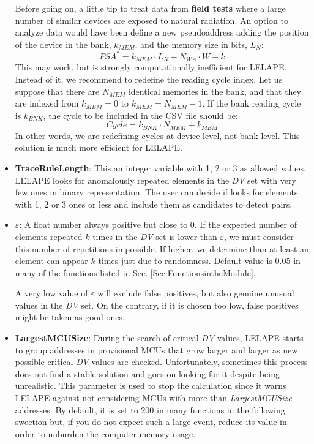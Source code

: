 \begin{itemize}
	Before going on, a little tip to treat data from\textbf{ field tests} where a large number of similar devices are exposed to natural radiation. An option to analyze data would have been define a new pseudoaddress adding the position of the device in the bank, \(k_{MEM}\), and the memory size in bits, \(L_N\):
	\[
		PSA^* = k_{MEM}\cdot L_N + N_{WA} \cdot W + k
	\]
	This may work, but is strongly computationally inefficient for LELAPE. Instead of it, we recommend to redefine the reading cycle index. Let us suppose that there are \(N_{MEM}\) identical memories in the bank, and that they are indexed from \(k_{MEM}=0\) to \(k_{MEM}=N_{MEM}-1\). If the bank reading cycle is \(k_{BNK}\), the cycle to be included in the CSV file should be:
	\begin{equation}
		Cycle = k_{BNK}\cdot N_{MEM}+k_{MEM}
	\end{equation}
	In other words, we are redefining cycles at device level, not bank level. This solution is much more efficient for LELAPE.
	\item \textbf{TraceRuleLength}: This an integer variable with 1, 2 or 3 as allowed values. LELAPE looks for anomalously repeated elements in the \textit{DV} set with very few ones in binary representation. The user can decide if looks for elements with 1, 2 or 3 ones or less and include them as candidates to detect pairs. 
	\item \textbf{$\varepsilon$}: A float number always positive but close to 0. If the expected number of elements repeated $k$ times in the \textit{DV} set is lower than $\varepsilon$, we must consider this number of repetitions impossible. If higher, we determine than at least an element can appear $k$ times just due to randomness. Default value is 0.05 in many of the functions listed in Sec. \ref{Sec:FunctionsintheModule}.
	
	A very low value of $\varepsilon$ will exclude false positives, but also genuine unusual values in the \textit{DV} set. On the contrary, if it is chosen too low, false positives might be taken as good ones.
	\item \textbf{LargestMCUSize}: During the search of critical \textit{DV} values, LELAPE starts to group addresses in provisional MCUs that grow larger and larger as new possible critical \textit{DV} values are checked. Unfortunately, sometimes this process does not find a stable solution and goes on looking for it despite being unrealistic. This parameter is used to stop the calculation since it warns LELAPE against not considering MCUs with more than \textit{LargestMCUSize} addresses. By default, it is set to 200 in many functions in the following swection but, if you do not expect such a large event, reduce its value in order to unburden the computer memory usage. 
\end{itemize}

